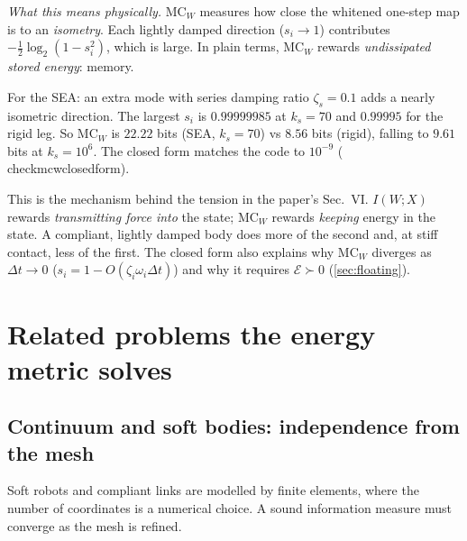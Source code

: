 \documentclass[11pt]{article}
\theoremstyle{definition}
\theoremstyle{remark}
\newcommand{\Em}{\mathcal{E}}         %
\newcommand{\codeus}{\textunderscore\allowbreak}
\newcommand{\code}[1]{{\ttfamily\let\_\codeus\hyphenchar\font=-1 #1}}
\newcommand{\phys}[1]{\par\smallskip\noindent\textit{What this means physically.} #1\par}
\begin{document}
\phys{$\mathrm{MC}_W$ measures how close the whitened one-step map is to an \emph{isometry}.
Each lightly damped direction ($s_i\to1$) contributes $-\frac12\log_2(1-s_i^2)$, which is
large. In plain terms, $\mathrm{MC}_W$ rewards \emph{undissipated stored energy}: memory.

For the SEA: an extra mode with series damping ratio $\zeta_s=0.1$ adds a nearly
isometric direction. The largest $s_i$ is $0.99999985$ at $k_s=70$ and $0.99995$ for the
rigid leg. So $\mathrm{MC}_W$ is $22.22$ bits (SEA, $k_s=70$) vs $8.56$ bits (rigid),
falling to $9.61$ bits at $k_s=10^6$. The closed form matches the code to $10^{-9}$
(\code{check\_mcw\_closed\_form}).

This is the mechanism behind the tension in the paper's Sec.~VI. $I(W;X)$ rewards
\emph{transmitting force into} the state; $\mathrm{MC}_W$ rewards \emph{keeping} energy in
the state. A compliant, lightly damped body does more of the second and, at stiff contact,
less of the first. The closed form also explains why $\mathrm{MC}_W$ diverges as
$\Delta t\to0$ ($s_i=1-O(\zeta_i\omega_i\Delta t)$) and why it requires $\Em\succ0$
(\cref{sec:floating}).}

\section{Related problems the energy metric solves}
\label{sec:related}

\subsection{Continuum and soft bodies: independence from the mesh}

Soft robots and compliant links are modelled by finite elements, where the number of
coordinates is a numerical choice. A sound information measure must converge as the mesh
is refined.
\end{document}
